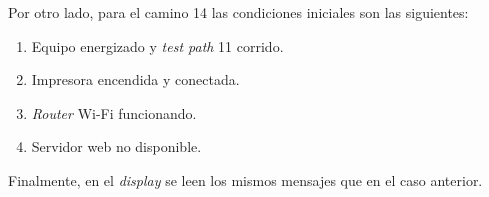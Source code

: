 Por otro lado, para el camino 14 las condiciones iniciales son las siguientes:
\begin{enumerate}
	\item Equipo energizado y \textit{test path} 11 corrido.
	\item Impresora encendida y conectada.
	\item \textit{Router} Wi-Fi funcionando.
	\item Servidor web no disponible.
\end{enumerate}

Finalmente, en el \textit{display} se leen los mismos mensajes que en el caso anterior.
